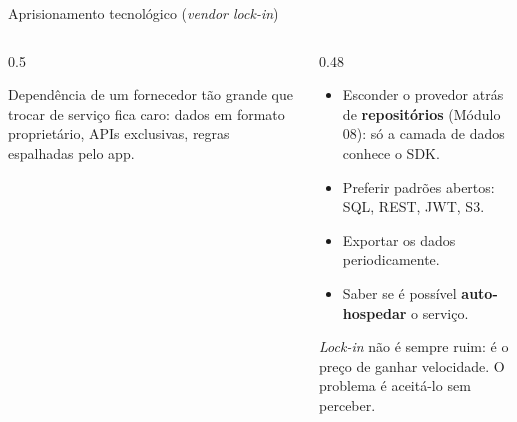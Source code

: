 \documentclass[aspectratio=169,10pt]{beamer}
\begin{document}
\begin{frame}{Aprisionamento tecnológico (\emph{vendor lock-in})}
  \begin{columns}[T]
    \begin{column}{0.5\textwidth}
      \begin{definicao}
        Dependência de um fornecedor tão grande que trocar de serviço fica caro: dados em formato proprietário, APIs exclusivas, regras espalhadas pelo app.
      \end{definicao}
      \centering
    \end{column}
    \begin{column}{0.48\textwidth}
      \begin{conceito}
        \begin{itemize}
          \item Esconder o provedor atrás de \textbf{repositórios} (Módulo 08): só a camada de dados conhece o SDK.
          \item Preferir padrões abertos: SQL, REST, JWT, S3.
          \item Exportar os dados periodicamente.
          \item Saber se é possível \textbf{auto-hospedar} o serviço.
        \end{itemize}
      \end{conceito}
      \begin{dica}
        \emph{Lock-in} não é sempre ruim: é o preço de ganhar velocidade. O problema é aceitá-lo sem perceber.
      \end{dica}
    \end{column}
  \end{columns}
\end{frame}
\end{document}
